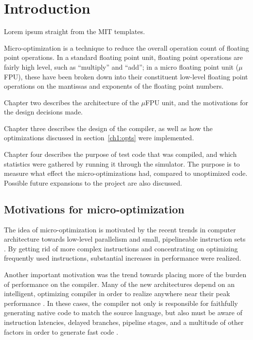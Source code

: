 \chapter{Introduction}

Lorem ipsum straight from the MIT templates.

Micro-optimization is a technique to reduce the overall operation count of
floating point operations.  In a standard floating point unit, floating
point operations are fairly high level, such as ``multiply'' and ``add'';
in a micro floating point unit ($\mu$FPU), these have been broken down into
their constituent low-level floating point operations on the mantissas and
exponents of the floating point numbers.

Chapter two describes the architecture of the $\mu$FPU unit, and the
motivations for the design decisions made.

Chapter three describes the design of the compiler, as well as how the
optimizations discussed in section~\ref{ch1:opts} were implemented.

Chapter four describes the purpose of test code that was compiled, and which
statistics were gathered by running it through the simulator.  The purpose
is to measure what effect the micro-optimizations had, compared to
unoptimized code.  Possible future expansions to the project are also
discussed.

\section{Motivations for micro-optimization}

The idea of micro-optimization is motivated by the recent trends in computer
architecture towards low-level parallelism and small, pipelineable
instruction sets \cite{patterson:risc,rad83}.  By getting rid of more
complex instructions and concentrating on optimizing frequently used
instructions, substantial increases in performance were realized.

Another important motivation was the trend towards placing more of the
burden of performance on the compiler.  Many of the new architectures depend
on an intelligent, optimizing compiler in order to realize anywhere near
their peak performance
\cite{ellis:bulldog,pet87,coutant:precision-compilers}.  In these cases, the
compiler not only is responsible for faithfully generating native code to
match the source language, but also must be aware of instruction latencies,
delayed branches, pipeline stages, and a multitude of other factors in order
to generate fast code \cite{gib86}.

